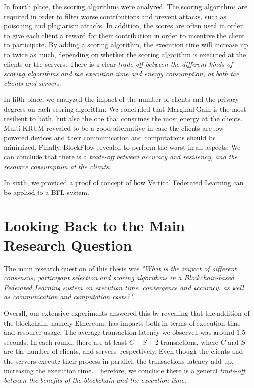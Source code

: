 In fourth place, the scoring algorithms were analyzed. The scoring algorithms are required in order to filter worse contributions and prevent attacks, such as poisoning and plagiarism attacks. In addition, the scores are often used in order to give each client a reward for their contribution in order to incentive the client to participate. By adding a scoring algorithm, the execution time will increase up to twice as much, depending on whether the scoring algorithm is executed at the clients or the servers. There is a clear \textit{trade-off between the different kinds of scoring algorithms and the execution time and energy consumption, at both the clients and servers}.

In fifth place, we analyzed the impact of the number of clients and the privacy degrees on each scoring algorithm. We concluded that Marginal Gain is the most resilient to both, but also the one that consumes the most energy at the clients. Multi-KRUM revealed to be a good alternative in case the clients are low-powered devices and their communication and computations should be minimized. Finally, BlockFlow revealed to perform the worst in all aspects. We can conclude that there is a \textit{trade-off between accuracy and resiliency, and the resource consumption at the clients}.

In sixth, we provided a proof of concept of how Vertical Federated Learning can be applied to a BFL system.

\section{Looking Back to the Main Research Question}\label{conclusions:general}

The main research question of this thesis was \textit{"What is the impact of different consensus, participant selection and scoring algorithms in a Blockchain-based Federated Learning system on execution time, convergence and accuracy, as well as communication and computation costs?"}. 

Overall, our extensive experiments answered this by revealing that the addition of the blockchain, namely Ethereum, has impacts both in terms of execution time and resource usage. The average transaction latency we observed was around $1.5$ seconds. In each round, there are at least $C+S+2$ transactions, where $C$ and $S$ are the number of clients, and servers, respectively. Even though the clients and the servers execute their process in parallel, the transactions latency add up, increasing the execution time. Therefore, we conclude there is a general \textit{trade-off between the benefits of the blockchain and the execution time}.

